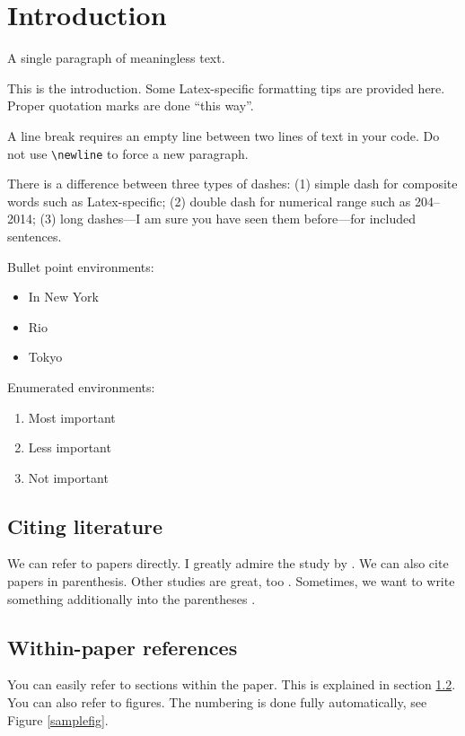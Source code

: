 \section{Introduction}
A single paragraph of meaningless text.  \lipsum[1]


This is the introduction. Some Latex-specific formatting tips are provided here. Proper quotation marks are done ``this way''. 

A line break requires an empty line between two lines of text in your code. Do not use \verb+\newline+ to force a new paragraph.

There is a difference between three types of dashes: (1) simple dash for composite words such as Latex-specific; (2) double dash for numerical range such as 204--2014; (3) long dashes---I am sure you have seen them before---for included sentences.

Bullet point environments:
\begin{itemize}
\item In New York
\item Rio
\item Tokyo
\end{itemize}

Enumerated environments:
\begin{enumerate}
\item Most important
\item Less important
\item Not important
\end{enumerate}

\subsection{Citing literature}
We can refer to papers directly. I greatly admire the study by \cite{ADRIAN1934}. We can also cite papers in parenthesis. Other studies are great, too \citep{Albrecht1982}. Sometimes, we want to write something additionally into the parentheses \citep[the study by][is also not bad]{Allard2011}.

\subsection{Within-paper references}
\label{withpaperrefs}
You can easily refer to sections within the paper. This is explained in section \ref{withpaperrefs}. You can also refer to figures. The numbering is done fully automatically, see Figure \ref{samplefig}.


